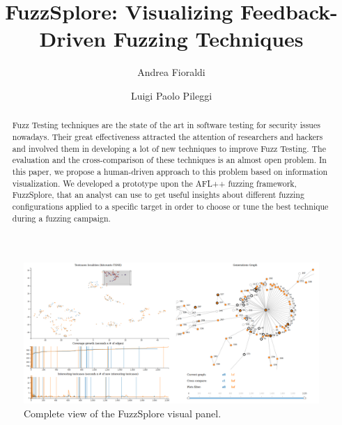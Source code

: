 \documentclass[conference,compsoc]{IEEEtran}
\begin{document}
\title{FuzzSplore: Visualizing Feedback-Driven Fuzzing Techniques}

\author[1]{Andrea Fioraldi}
\author[1]{Luigi Paolo Pileggi}

\maketitle

\begin{figure}[t]
\centering
\includegraphics[width=1.0\textwidth]{img/full}
\caption{Complete view of the {\sc FuzzSplore} visual panel.}
\label{fig:full}
\end{figure}

\begin{abstract}
Fuzz Testing techniques are the state of the art in software testing for security issues nowadays.
Their great effectiveness attracted the attention of researchers and hackers and involved them in developing a lot of new techniques to improve Fuzz Testing.
The evaluation and the cross-comparison of these techniques is an almost open problem. In this paper, we propose a human-driven approach to this problem based on information visualization.
We developed a prototype upon the {\sc AFL++} fuzzing framework, {\sc FuzzSplore}, that an analyst can use to get useful insights about different fuzzing configurations applied to a specific target in order to choose or tune the best technique during a fuzzing campaign.
\end{abstract}
\end{document}
